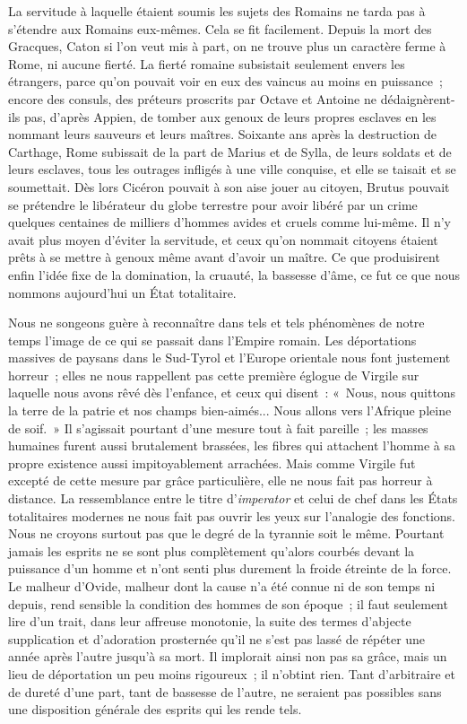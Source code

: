 \documentclass[french,twoside]{book} %
\begin{document}
La servitude à laquelle étaient soumis les sujets des Romains ne tarda pas à s'étendre aux Romains eux-mêmes. Cela se fit facilement. Depuis la mort des Gracques, Caton si l'on veut mis à part, on ne trouve plus un caractère ferme à Rome, ni aucune fierté. La fierté romaine subsistait seulement envers les étrangers, parce qu'on pouvait voir en eux des vaincus au moins en puis­sance ; encore des consuls, des préteurs proscrits par Octave et Antoine ne dédaignèrent-ils pas, d'après Appien, de tomber aux genoux de leurs propres esclaves en les nommant leurs sauveurs et leurs maîtres. Soixante ans après la destruction de Carthage, Rome subissait de la part de Marius et de Sylla, de leurs soldats et de leurs esclaves, tous les outrages infligés à une ville con­quise, et elle se taisait et se soumettait. Dès lors Cicéron pouvait à son aise jouer au citoyen, Brutus pouvait se prétendre le libérateur du globe terrestre pour avoir libéré par un crime quelques centaines de milliers d'hommes avides et cruels comme lui-même. Il n'y avait plus moyen d'éviter la servitude, et ceux qu'on nommait citoyens étaient prêts à se mettre à genoux même avant d'avoir un maître. Ce que produisirent enfin l'idée fixe de la domination, la cruauté, la bassesse d'âme, ce fut ce que nous nommons aujourd'hui un État totalitaire.\par
Nous ne songeons guère à reconnaître dans tels et tels phénomènes de notre temps l'image de ce qui se passait dans l'Empire romain. Les déporta­tions massives de paysans dans le Sud-Tyrol et l'Europe orientale nous font justement horreur ; elles ne nous rappellent pas cette première églogue de Virgile sur laquelle nous avons rêvé dès l'enfance, et ceux qui disent : « Nous, nous quittons la terre de la patrie et nos champs bien-aimés... Nous allons vers l'Afrique pleine de soif. » Il s'agissait pourtant d'une mesure tout à fait pareille ; les masses humaines furent aussi brutalement brassées, les fibres qui attachent l'homme à sa propre existence aussi impitoyablement arrachées. Mais comme Virgile fut excepté de cette mesure par grâce particulière, elle ne nous fait pas horreur à distance. La ressemblance entre le titre d'{\itshape imperator} et celui de chef dans les États totalitaires modernes ne nous fait pas ouvrir les yeux sur l'analogie des fonctions. Nous ne croyons surtout pas que le degré de la tyrannie soit le même. Pourtant jamais les esprits ne se sont plus complète­ment qu'alors courbés devant la puissance d'un homme et n'ont senti plus durement la froide étreinte de la force. Le malheur d'Ovide, malheur dont la cause n'a été connue ni de son temps ni depuis, rend sensible la condition des hommes de son époque ; il faut seulement lire d'un trait, dans leur affreuse monotonie, la suite des termes d'abjecte supplication et d'adoration prosternée qu'il ne s'est pas lassé de répéter une année après l'autre jusqu'à sa mort. Il implorait ainsi non pas sa grâce, mais un lieu de déportation un peu moins rigoureux ; il n'obtint rien. Tant d'arbitraire et de dureté d'une part, tant de bassesse de l'autre, ne seraient pas possibles sans une disposition générale des esprits qui les rende tels.\par
\end{document}
